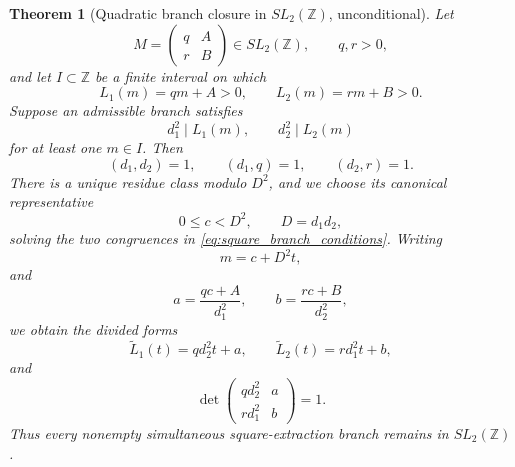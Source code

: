 \documentclass[11pt]{amsart}
\numberwithin{equation}{section}
\theoremstyle{plain}
\newtheorem{theorem}{Theorem}[section]
\theoremstyle{definition}
\theoremstyle{remark}
\newcommand{\Z}{\mathbb Z}
\begin{document}
\begin{theorem}[Quadratic branch closure in $SL_2(\Z)$, unconditional]
\label{thm:SL2_square_closure}
Let
\begin{equation}
M=\begin{pmatrix}q&A\\r&B\end{pmatrix}\in SL_2(\Z),
\qquad q,r>0,
\label{eq:M_SL2}
\end{equation}
and let $I\subset\Z$ be a finite interval on which
\begin{equation}
L_1(m)=qm+A>0,
\qquad
L_2(m)=rm+B>0.
\label{eq:positive_forms}
\end{equation}
Suppose an admissible branch satisfies
\begin{equation}
d_1^2\mid L_1(m),
\qquad
d_2^2\mid L_2(m)
\label{eq:square_branch_conditions}
\end{equation}
for at least one $m\in I$.  Then
\begin{equation}
(d_1,d_2)=1,
\qquad
(d_1,q)=1,
\qquad
(d_2,r)=1.
\label{eq:branch_coprimalities}
\end{equation}
There is a unique residue class modulo $D^2$, and we choose its canonical representative
\begin{equation}
0\le c<D^2,
\qquad D=d_1d_2,
\label{eq:CRT_class}
\end{equation}
solving the two congruences in \eqref{eq:square_branch_conditions}.  Writing
\begin{equation}
m=c+D^2t,
\label{eq:branch_parameterization}
\end{equation}
and
\begin{equation}
a=\frac{qc+A}{d_1^2},
\qquad
b=\frac{rc+B}{d_2^2},
\label{eq:a_b_branch}
\end{equation}
we obtain the divided forms
\begin{equation}
\widetilde L_1(t)=qd_2^2t+a,
\qquad
\widetilde L_2(t)=rd_1^2t+b,
\label{eq:renormalized_forms}
\end{equation}
and
\begin{equation}
\det\begin{pmatrix}qd_2^2&a\\rd_1^2&b\end{pmatrix}=1.
\label{eq:renormalized_determinant}
\end{equation}
Thus every nonempty simultaneous square-extraction branch remains in $SL_2(\Z)$.
\end{theorem}
\end{document}
